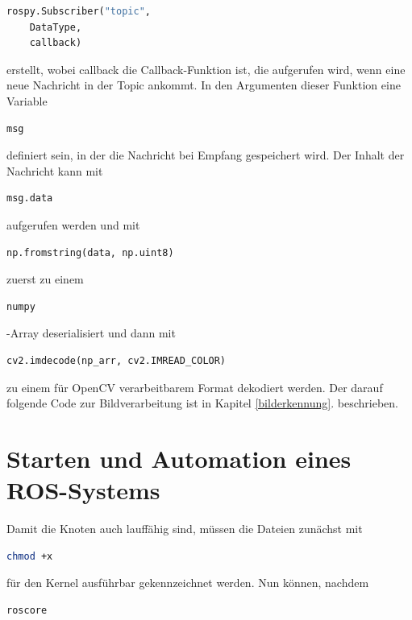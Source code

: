 \begin{lstlisting}[language=Python]
rospy.Subscriber("topic", 
	DataType,
	callback)
\end{lstlisting}

erstellt, wobei callback die Callback-Funktion ist, die aufgerufen wird, wenn eine neue Nachricht in der Topic ankommt. In den Argumenten dieser Funktion eine Variable 

\begin{lstlisting}[language=Python]
msg
\end{lstlisting}

definiert sein, in der die Nachricht bei Empfang gespeichert wird. Der Inhalt der Nachricht kann mit 

\begin{lstlisting}[language=Python]
msg.data
\end{lstlisting}

aufgerufen werden und mit 

\begin{lstlisting}[language=Python]
np.fromstring(data, np.uint8)
\end{lstlisting}

zuerst zu einem 

\begin{lstlisting}[language=Python]
numpy
\end{lstlisting}-Array deserialisiert und dann mit 

\begin{lstlisting}[language=Python]
cv2.imdecode(np_arr, cv2.IMREAD_COLOR)
\end{lstlisting}

zu einem für OpenCV verarbeitbarem Format dekodiert werden. Der darauf folgende Code zur Bildverarbeitung ist in Kapitel \ref{bilderkennung}. beschrieben. 

\section{Starten und Automation eines ROS-Systems}
Damit die Knoten auch lauffähig sind, müssen die Dateien zunächst mit 

\begin{lstlisting}[language=bash]
chmod +x
\end{lstlisting}

für den Kernel ausführbar gekennzeichnet werden. Nun können, nachdem 

\begin{lstlisting}[language=bash]
roscore
\end{lstlisting}

